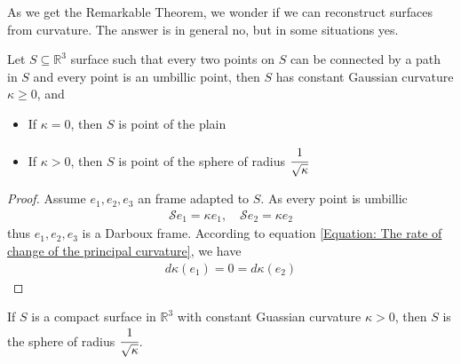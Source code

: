 \documentclass[10pt]{article}
\begin{document}
            As we get the Remarkable Theorem, we wonder if we can reconstruct surfaces from curvature. The answer is in general no, but in some situations yes. 
            \begin{theorem}
                Let $S\subseteq\mathbb{R}^3$ surface such that every two points on $S$ can be connected by a path in $S$ and every point is an umbillic point, then $S$ has constant Gaussian curvature $\kappa\ge 0$, and
                \begin{itemize}
                    \item If $\kappa=0$, then $S$ is point of the plain
                    \item If $\kappa>0$, then $S$ is point of the sphere of radius $\cfrac{1}{\sqrt{\kappa}}$
                \end{itemize}
            \end{theorem}
            \begin{proof}
                Assume $e_1,e_2,e_3$ an frame adapted to $S$. As every point is umbillic
                \begin{equation*}
                    \begin{aligned}
                        \mathcal{S}e_1 = \kappa e_1, \quad \mathcal{S}e_2 = \kappa e_2
                    \end{aligned}
                \end{equation*}
                thus $e_1,e_2,e_3$ is a Darboux frame. According to equation \eqref{Equation: The rate of change of the principal curvature}, we have
                \begin{equation*}
                    \begin{aligned}
                        d\kappa(e_1) = 0 = d\kappa(e_2)
                    \end{aligned}
                \end{equation*}
            \end{proof}
            \begin{theorem}
                If $S$ is a compact surface in $\mathbb{R}^3$ with constant Guassian curvature $\kappa>0$, then $S$ is the sphere of radius $\cfrac{1}{\sqrt{\kappa}}$.
            \end{theorem}
\end{document}
